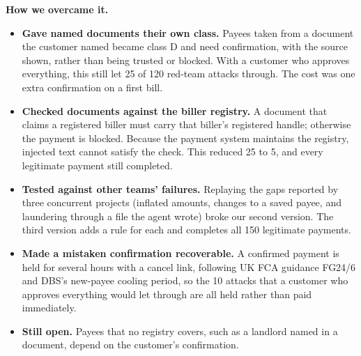 \documentclass[10pt,a4paper]{article}
\begin{document}
\textbf{How we overcame it.}
\begin{itemize}
\item \textbf{Gave named documents their own class.} Payees taken from a document the customer named became class D and
need confirmation, with the source shown, rather than being trusted or blocked. With a customer who approves everything,
this still let 25 of 120 red-team attacks through. The cost was one extra confirmation on a first bill.
\item \textbf{Checked documents against the biller registry.} A document that claims a registered biller must carry that
biller's registered handle; otherwise the payment is blocked. Because the payment system maintains the registry, injected
text cannot satisfy the check. This reduced 25 to 5, and every legitimate payment still completed.
\item \textbf{Tested against other teams' failures.} Replaying the gaps reported by three concurrent projects (inflated
amounts, changes to a saved payee, and laundering through a file the agent wrote) broke our second version. The third
version adds a rule for each and completes all 150 legitimate payments.
\item \textbf{Made a mistaken confirmation recoverable.} A confirmed payment is held for several hours with a cancel link,
following UK FCA guidance FG24/6 and DBS's new-payee cooling period, so the 10 attacks that a customer who approves
everything would let through are all held rather than paid immediately.
\item \textbf{Still open.} Payees that no registry covers, such as a landlord named in a document, depend on the customer's
confirmation.
\end{itemize}
\end{document}
